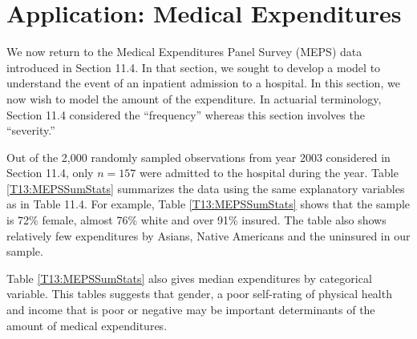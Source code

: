 \section{Application: Medical Expenditures}

We now return to the Medical Expenditures Panel Survey (MEPS) data
introduced in Section 11.4. In that section, we sought to develop a
model to understand the event of an inpatient admission to a
hospital. In this section, we now wish to model the amount of the
expenditure. In actuarial terminology, Section 11.4 considered the
``frequency'' whereas this section involves the ``severity.''

Out of the 2,000 randomly sampled observations from year 2003
considered in Section 11.4, only $n=157$ were admitted to the
hospital during the year. Table \ref{T13:MEPSSumStats} summarizes
the data using the same explanatory variables as in Table 11.4. For
example, Table \ref{T13:MEPSSumStats} shows that the sample is 72\%
female, almost 76\% white and over 91\% insured. The table also
shows relatively few expenditures by Asians, Native Americans and
the uninsured in our sample.

Table \ref{T13:MEPSSumStats} also gives median expenditures by
categorical variable. This tables suggests that gender, a poor
self-rating of physical health and income that is poor or negative
may be important determinants of the amount of medical expenditures.


